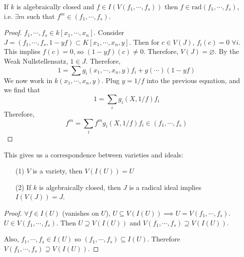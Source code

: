 \documentclass[a4paper,twoside,master.tex]{subfiles}
\begin{document}
\begin{theorem}
    If $ k $ is algebraically closed and $ f \in I(V(f_1, \cdots, f_s)) $ then $ f \in \text{rad}(f_1, \cdots, f_s) $, i.e. $ \exists m $ such that $ f^m \in (f_1, \cdots, f_s) $.
\end{theorem}
\begin{proof}
    $ f_1, \cdots, f_s \in k[x_1, \cdots, x_n] $. Consider $ J = (f_1, \cdots, f_s, 1-yf) \subset K[x_1, \cdots, x_n, y] $. Then for $ c \in V(J) $, $ f_i(c) = 0 $ $ \forall i $. This implies $ f(c) = 0 $, so $ (1-yf)(c) \neq 0 $. Therefore, $ V(J) = \varnothing $. By the Weak Nullstellensatz, $ 1 \in J $. Therefore,
    \begin{equation}
        1 = \sum g_i(x_1, \cdots, x_n, y) f_i + g(\cdots)(1-yf)
    \end{equation}
    We now work in $ k(x_1, \cdots, x_n, y) $. Plug $ y = 1/f $ into the previous equation, and we find that
    \begin{equation}
        1 = \sum_i g_i(X, 1/f) f_i
    \end{equation}
    Therefore,
    \begin{equation}
        f^m = \sum_i f^m g_i(X, 1/f) f_i \in (f_1, \cdots, f_s)
    \end{equation}
\end{proof}

This gives us a correspondence between varieties and ideals:
\begin{itemize}
    \item[(1)] $ V $ is a variety, then $ V(I(U)) = U $
    \item[(2)] If $ k $ is algebraically closed, then $ J $ is a radical ideal implies $ I(V(J)) = J $.
\end{itemize}

\begin{proof}
    $ \forall f \in I(U) $ (vanishes on $ U $), $ U \subseteq V(I(U)) \implies U = V(f_1, \cdots, f_s) $. $ U \in V(f_1, \cdots, f_s) $. Then $ U\supseteq V(I(U)) $ and $ V(f_1, \cdots, f_s) \supseteq V(I(U)) $.

    Also, $ f_1, \cdots, f_s \in I(U) $ so $ (f_1, \cdots, f_s) \subseteq I(U) $. Therefore $ V(f_1, \cdots, f_s) \supseteq V(I(U)) $.
\end{proof}
\end{document}
